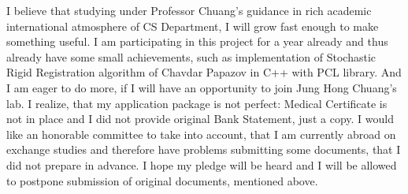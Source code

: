\documentclass[8pt]{article} %
\begin{document}
I believe that studying under Professor Chuang's guidance in rich academic international atmosphere of CS Department, I will grow fast enough to make something useful.
I am participating in this project for a year already and thus already have some small achievements,
such as implementation of Stochastic Rigid Registration algorithm of Chavdar Papazov
in C++ with PCL library. And I am eager to do more, if I will have an opportunity to join Jung Hong Chuang's lab. I realize, that my application package is not
perfect: Medical Certificate is not in place
and I did not provide original Bank Statement, just a copy. I would like an honorable committee to take into account, that I am currently abroad on exchange studies and
therefore have problems submitting some documents, that I did not prepare in advance. I hope my pledge will be heard and I will be allowed to postpone submission of
original documents, mentioned above.
\end{document}
